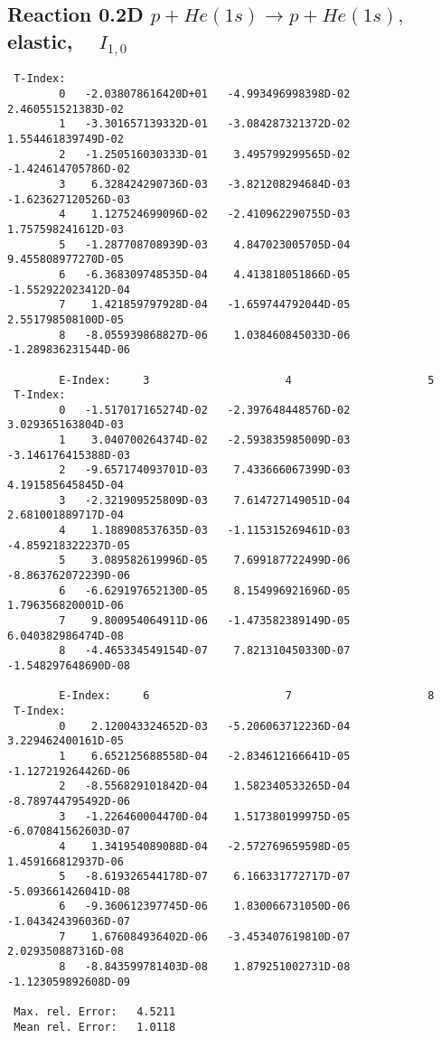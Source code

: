 \subsection{
Reaction 0.2D $ p + He(1s) \rightarrow p + He(1s) ,\quad $
elastic, $ \quad I_{1,0} $
}

\begin{verbatim}
 T-Index:
        0   -2.038078616420D+01   -4.993496998398D-02    2.460551521383D-02
        1   -3.301657139332D-01   -3.084287321372D-02    1.554461839749D-02
        2   -1.250516030333D-01    3.495799299565D-02   -1.424614705786D-02
        3    6.328424290736D-03   -3.821208294684D-03   -1.623627120526D-03
        4    1.127524699096D-02   -2.410962290755D-03    1.757598241612D-03
        5   -1.287708708939D-03    4.847023005705D-04    9.455808977270D-05
        6   -6.368309748535D-04    4.413818051866D-05   -1.552922023412D-04
        7    1.421859797928D-04   -1.659744792044D-05    2.551798508100D-05
        8   -8.055939868827D-06    1.038460845033D-06   -1.289836231544D-06

        E-Index:     3                     4                     5
 T-Index:
        0   -1.517017165274D-02   -2.397648448576D-02    3.029365163804D-03
        1    3.040700264374D-02   -2.593835985009D-03   -3.146176415388D-03
        2   -9.657174093701D-03    7.433666067399D-03    4.191585645845D-04
        3   -2.321909525809D-03    7.614727149051D-04    2.681001889717D-04
        4    1.188908537635D-03   -1.115315269461D-03   -4.859218322237D-05
        5    3.089582619996D-05    7.699187722499D-06   -8.863762072239D-06
        6   -6.629197652130D-05    8.154996921696D-05    1.796356820001D-06
        7    9.800954064911D-06   -1.473582389149D-05    6.040382986474D-08
        8   -4.465334549154D-07    7.821310450330D-07   -1.548297648690D-08

        E-Index:     6                     7                     8
 T-Index:
        0    2.120043324652D-03   -5.206063712236D-04    3.229462400161D-05
        1    6.652125688558D-04   -2.834612166641D-05   -1.127219264426D-06
        2   -8.556829101842D-04    1.582340533265D-04   -8.789744795492D-06
        3   -1.226460004470D-04    1.517380199975D-05   -6.070841562603D-07
        4    1.341954089088D-04   -2.572769659598D-05    1.459166812937D-06
        5   -8.619326544178D-07    6.166331772717D-07   -5.093661426041D-08
        6   -9.360612397745D-06    1.830066731050D-06   -1.043424396036D-07
        7    1.676084936402D-06   -3.453407619810D-07    2.029350887316D-08
        8   -8.843599781403D-08    1.879251002731D-08   -1.123059892608D-09

 Max. rel. Error:   4.5211
 Mean rel. Error:   1.0118
\end{verbatim}

